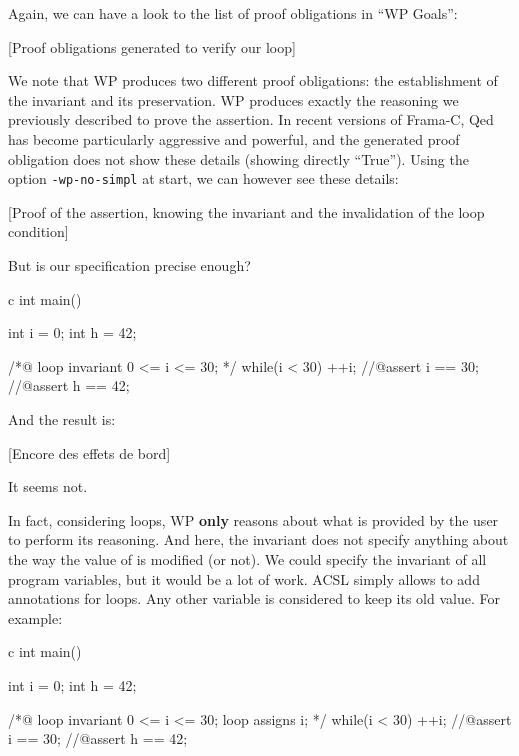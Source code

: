 Again, we can have a look to the list of proof obligations in ``WP
Goals'':



[Proof obligations generated to verify our loop]


We note that WP produces two different proof obligations: the
establishment of the invariant and its preservation. WP produces exactly
the reasoning we previously described to prove the assertion. In recent
versions of Frama-C, Qed has become particularly aggressive and
powerful, and the generated proof obligation does not show these details
(showing directly ``True''). Using the option \texttt{-wp-no-simpl} at
start, we can however see these details:



[Proof of the assertion, knowing the invariant and the
  invalidation of the loop condition]


But is our specification precise enough?



\begin{CodeBlock}{c}
int main(){
  int i = 0;
  int h = 42;
  
  /*@
    loop invariant 0 <= i <= 30;
  */
  while(i < 30){
    ++i;
  }
  //@assert i == 30;
  //@assert h == 42;
}
\end{CodeBlock}



And the result is:



[Encore des effets de bord]


It seems not.





In fact, considering loops, WP \textbf{only} reasons about what is
provided by the user to perform its reasoning. And here, the invariant
does not specify anything about the way the value of  is
modified (or not). We could specify the invariant of all program
variables, but it would be a lot of work. ACSL simply allows to add
 annotations for loops. Any other variable is considered
to keep its old value. For example:



\begin{CodeBlock}{c}
int main(){
  int i = 0;
  int h = 42;
  
  /*@
    loop invariant 0 <= i <= 30;
    loop assigns i;
  */
  while(i < 30){
    ++i;
  }
  //@assert i == 30;
  //@assert h == 42;
}
\end{CodeBlock}



